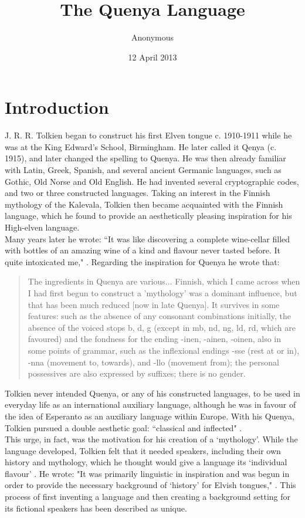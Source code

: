 \documentclass[pub]{apa6}
\title{The Quenya Language}
\author{Anonymous}
\affiliation{Middle Earth}
\date{12 April 2013}
\begin{document}
\maketitle
\abstract


\section{Introduction}
J. R. R. Tolkien began to construct his first Elven tongue c. 1910-1911 while he was at the King Edward's School,
Birmingham. He later called it Qenya (c. 1915), and later changed the spelling to Quenya. He was then already
familiar with Latin, Greek, Spanish, and several ancient Germanic languages, such as Gothic, Old Norse and Old
English. He had invented several cryptographic codes, and two or three constructed languages. Taking an interest in the Finnish mythology of the Kalevala, Tolkien then became acquainted with the Finnish language, which he found to provide an aesthetically pleasing inspiration for his High-elven language.\\
\indent Many years later he wrote: ``It was like discovering a complete wine-cellar filled with bottles of an amazing wine of a kind and flavour never tasted before. It quite intoxicated me," \cite{tolkien2000}. Regarding the inspiration for Quenya he wrote that:
\begin{quotation}
The ingredients in Quenya are various... Finnish, which I came across when I had first begun to construct a 'mythology' was a dominant influence, but that has been much reduced [now in late Quenya]. It survives in some features: such as the absence of any consonant combinations initially, the absence of the voiced stops b, d, g (except in mb, nd, ng, ld, rd, which are favoured) and the fondness for the ending -inen, -ainen, -oinen, also in some points of grammar, such as the inflexional endings -sse (rest at or in), -nna (movement to, towards), and -llo (movement from); the personal possessives are also expressed by suffixes; there is no gender. \cite{tolkien1964}
\end{quotation}
Tolkien never intended Quenya, or any of his constructed languages, to be used in everyday life as an international auxiliary language, although he was in favour of the idea of Esperanto as an auxiliary language within Europe. With his Quenya, Tolkien pursued a double aesthetic goal: ``classical and inflected" \cite{tolkien1964}. \\
\indent This urge, in fact, was the motivation for his creation of a `mythology'. While the language developed, Tolkien felt that it needed speakers, including their own history and mythology, which he thought would give a language its `individual flavour' \cite{tolkien1968}. He wrote: "It was primarily linguistic in inspiration and was begun in order to provide the necessary background of `history' for Elvish tongues," \cite{tolkien1968}. This process of first inventing a language and then creating a background setting for its fictional speakers has been described as unique. \\
\end{document}
